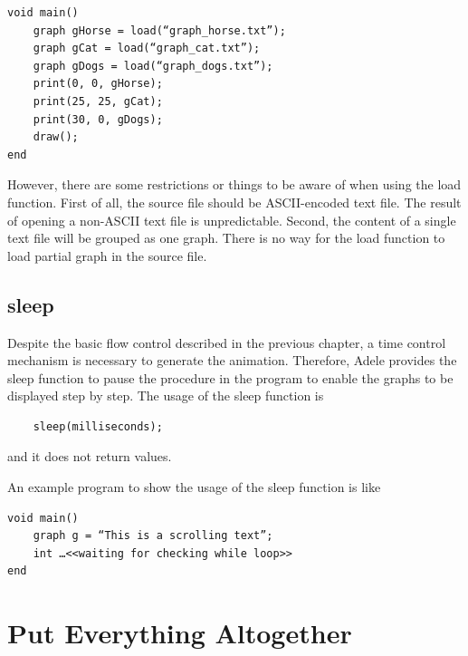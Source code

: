 \documentclass[11pt,letterpaper]{article}
\begin{document}
\begin{lstlisting}[caption=animals.adl, label=animal, captionpos=b]
void main()
	graph gHorse = load(“graph_horse.txt”);
	graph gCat = load(“graph_cat.txt”);
	graph gDogs = load(“graph_dogs.txt”);
	print(0, 0, gHorse);
	print(25, 25, gCat);
	print(30, 0, gDogs);
	draw();
end
\end{lstlisting}

However, there are some restrictions or things to be aware of when using the load function. First of all, the source file should be ASCII-encoded text file. The result of opening a non-ASCII text file is unpredictable. Second, the content of a single text file will be grouped as one graph. There is no way for the load function to load partial graph in the source file.

\subsection {sleep}

Despite the basic flow control described in the previous chapter, a time control mechanism is necessary to generate the animation. Therefore, Adele provides the sleep function to pause the procedure in the program to enable the graphs to be displayed step by step. The usage of the sleep function is
\begin{lstlisting}
	sleep(milliseconds);
\end{lstlisting}
and it does not return values.

An example program to show the usage of the sleep function is like

\begin{lstlisting}[caption=marquee.adl, label=marquee, captionpos=b]
void main()
	graph g = “This is a scrolling text”;
	int …<<waiting for checking while loop>>
end
\end{lstlisting}

\section {Put Everything Altogether}
\end{document}

